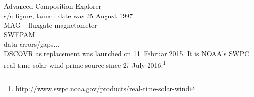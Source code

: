 Advanced Composition Explorer\\
s/c figure, launch date was 25 August 1997\\

MAG -- fluxgate magnetometer\\
SWEPAM\\	%

data errors/gaps...\\

DSCOVR as replacement was launched on 11~Februar 2015. It is NOAA's SWPC real-time solar wind prime source since 27 July 2016.\footnote{\url{http://www.swpc.noaa.gov/products/real-time-solar-wind}}\\
